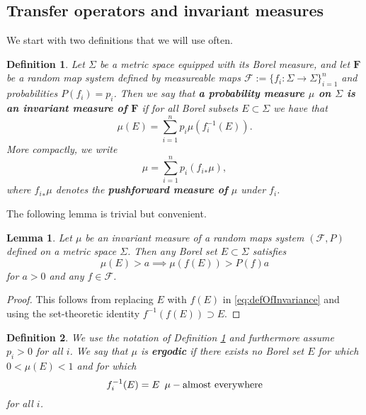 \documentclass[pdftex,11pt,a4paper,oneside]{article}
\theoremstyle{plain}
\newtheorem{lemma}{Lemma}[section]
\newtheorem{definition}{Definition}[section]
\begin{document}
\subsection{Transfer operators and invariant measures}
We start with two definitions that we will use often.
\begin{definition}\label{def:Invariant Measures}
Let $\Sigma$ be a metric space equipped with its Borel measure, and let $\mathbf{F}$ be a random map system defined by measureable maps $\mathcal{F}:=\{f_i:\Sigma\to\Sigma\}_{i=1}^n$ and probabilities $P(f_i) = p_i$. Then we say that \textbf{a probability measure $\mu$ on $\Sigma$ is an invariant measure of $\mathbf{F}$ } if for all Borel subsets $E\subset \Sigma$ we have that 
\begin{equation}\label{eq:defOfInvariance}
    \mu(E) = \sum_{i=1}^n p_i\mu\left(f_i^{-1}(E)\right).
\end{equation}
More compactly, we write
\[\mu = \sum_{i=1}^n p_i ({f_i}_*\mu),\]
where ${f_i}_*\mu$ denotes the \textbf{pushforward measure of } $\mu$ under $f_i$. 
\end{definition}
The following lemma is trivial but convenient. 
\begin{lemma}\label{lemma:MeasuresUnderMaps}
    Let $\mu$ be an invariant measure of a random maps system $(\mathcal{F},P)$ defined on a metric space $\Sigma$. Then any Borel set $E\subset \Sigma$ satisfies
    \[\mu(E)>a \implies \mu(f(E)) > P(f)a\]
    for $a>0$ and any $f\in\mathcal{F}$.
\end{lemma}
\begin{proof}
This follows from replacing $E$ with $f(E)$ in \eqref{eq:defOfInvariance} and using the set-theoretic identity $f^{-1}(f(E))\supset E$. 
\end{proof}
\begin{definition}
We use the notation of Definition \ref{def:Invariant Measures} and furthermore assume $p_i>0$ for all $i$. We say that $\mu$ is \textbf{ergodic} if there exists no Borel set $E$ for which $0<\mu(E)<1$ and for which 
\[f_i^{-1}(E) = E \enskip \mu-\text{almost everywhere}\]
for all $i$. 
\end{definition}
\end{document}
